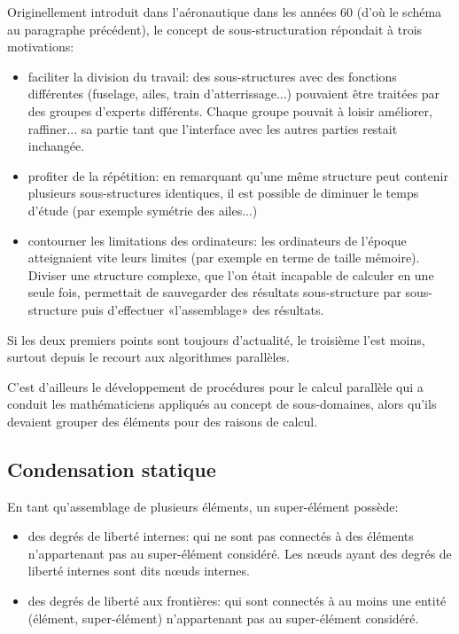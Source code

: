 \medskip
\begin{histoire}
Originellement introduit dans l'aéronautique dans les années 60 (d'où le schéma au paragraphe précédent), le concept de sous-structuration répondait à trois motivations:
\begin{itemize}
  \item faciliter la division du travail:
	des sous-structures avec des fonctions différentes (fuselage, ailes, train d'atterrissage...) pouvaient être traitées par des groupes d'experts différents. Chaque groupe pouvait à loisir améliorer, raffiner... sa partie tant que l'interface avec les autres parties restait inchangée.
  \item profiter de la répétition:
	en remarquant qu'une même structure peut contenir plusieurs sous-structures identiques, il est possible de diminuer le temps d'étude (par exemple symétrie des ailes...) 
  \item contourner les limitations des ordinateurs:
	les ordinateurs de l'époque atteignaient vite leurs limites (par exemple en terme de taille mémoire). Diviser une structure complexe, que l'on était incapable de calculer en une seule fois, permettait de sauvegarder des résultats sous-structure par sous-structure puis d'effectuer «l'assemblage» des résultats.
\end{itemize}
Si les deux premiers points sont toujours d'actualité, le troisième l'est moins, surtout depuis le recourt aux algorithmes parallèles.

C'est d'ailleurs le développement de procédures pour le calcul parallèle qui a conduit les mathématiciens appliqués au concept de sous-domaines, alors qu'ils devaient grouper des éléments pour des raisons de calcul.
\end{histoire}

\medskip
\subsection{Condensation statique}\label{Sec-condens}

En tant qu'assemblage de plusieurs éléments, un super-élément possède:
\begin{itemize}
  \item des degrés de liberté internes:
	qui ne sont pas connectés à des éléments n'appartenant pas au super-élément considéré.
	Les nœuds ayant des degrés de liberté internes sont dits nœuds internes.
  \item des degrés de liberté aux frontières:
	qui sont connectés à au moins une entité (élément, super-élément)
	n'appartenant pas au super-élément considéré.
\end{itemize}

